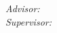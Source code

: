 \begin{titlepage}
\vfill\vfill\vfill
{ \large \center 
\textit{Advisor:}\\
\Advisor
}
\vfill
{ \large \center 
	\textit{Supervisor:}\\
	\FirstSupervisor
}

 
\vfill %
\end{titlepage}

\cleardoublepage

\tableofcontents